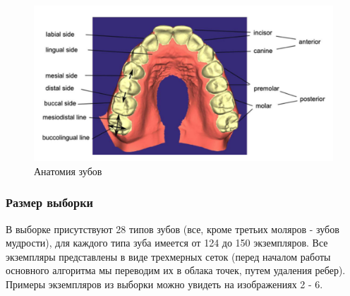 \begin{figure}[h]
\includegraphics[width=1\linewidth]{images/dental_parts.png}
\caption{Анатомия зубов}
\label{fig:dental_parts}
\end{figure}


\subsubsection{Размер выборки}

В выборке присутствуют 28 типов зубов (все, кроме третьих моляров - зубов мудрости), для каждого типа зуба имеется от 124 до 150 экземпляров. Все экземпляры представлены в виде трехмерных сеток (перед началом работы основного алгоритма мы переводим их в облака точек, путем удаления ребер). Примеры экземпляров из выборки можно увидеть на  изображениях 2 - 6. %


